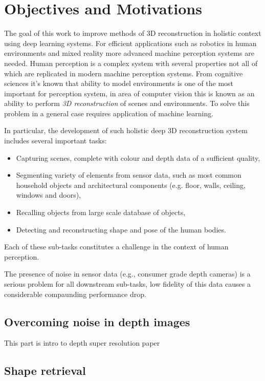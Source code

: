 \section{Objectives and Motivations}

The goal of this work to improve methods of 3D reconstruction in holistic context using deep learning systems. For efficient applications such as robotics in human environments and mixed reality more advanced machine perception systems are needed. Human perception is a complex system with several properties not all of which are replicated in modern machine perception systems. From cognitive sciences it's known that ability to model environments is one of the most important for perception system, in area of computer vision this is known as an ability to perform \textit{3D reconstruction} of scenes and environments. To solve this problem in a general case requires application of machine learning.

In particular, the development of such holistic deep 3D reconstruction system includes several important tasks:

\begin{itemize}
    \item Capturing scenes, complete with colour and depth data of a sufficient quality,
    \item Segmenting variety of elements from sensor data, such as most common household objects and architectural components (e.g. floor, walls, ceiling, windows and doors),
    \item Recalling objects from large scale database of objects,
    \item Detecting and reconstructing shape and pose of the human bodies.
\end{itemize}

Each of these sub-tasks constitutes a challenge in the context of human perception.

The presence of noise in sensor data (e.g., consumer grade depth cameras) is a serious problem for all downstream sub-tasks, low fidelity of this data causes a considerable compaunding performance drop.

\subsection{Overcoming noise in depth images}

This part is intro to depth super resolution paper

\subsection{Shape retrieval}


